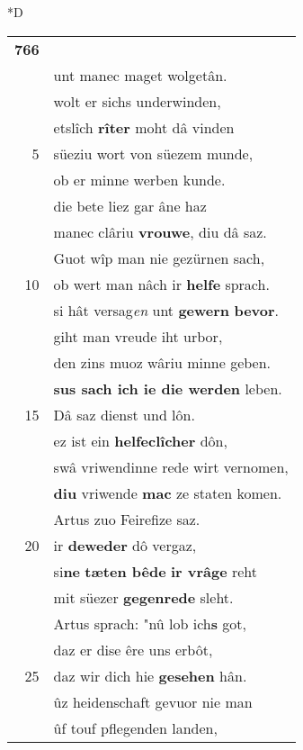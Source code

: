 \documentclass[8pt,a4paper,notitlepage]{article}
\begin{document}
\begin{table}[ht]
\begin{minipage}[t]{0.5\linewidth}
\small
\begin{center}*D
\end{center}
\begin{tabular}{rl}
\textbf{766} & \textit{\begin{large}N\end{large}}ider sâzen wîb und man\\ 
 & unt manec maget wolgetân.\\ 
 & wolt er sichs underwinden,\\ 
 & etslîch \textbf{rîter} moht dâ vinden\\ 
5 & süeziu wort von süezem munde,\\ 
 & ob er minne werben kunde.\\ 
 & die bete liez gar âne haz\\ 
 & manec clâriu \textbf{vrouwe}, diu dâ saz.\\ 
 & Guot wîp man nie gezürnen sach,\\ 
10 & ob wert man nâch ir \textbf{helfe} sprach.\\ 
 & si hât versag\textit{en} unt \textbf{gewern} \textbf{bevor}.\\ 
 & giht man vreude iht urbor,\\ 
 & den zins muoz wâriu minne geben.\\ 
 & \textbf{sus sach ich ie die werden} leben.\\ 
15 & Dâ saz dienst und lôn.\\ 
 & ez ist ein \textbf{helfeclîcher} dôn,\\ 
 & swâ vriwendinne rede wirt vernomen,\\ 
 & \textbf{diu} vriwende \textbf{mac} ze staten komen.\\ 
 & Artus zuo Feirefize saz.\\ 
20 & ir \textbf{deweder} dô vergaz,\\ 
 & si\textbf{ne} \textbf{tæten bêde} \textbf{ir vrâge} reht\\ 
 & mit süezer \textbf{gegenrede} sleht.\\ 
 & Artus sprach: "nû lob ich\textbf{s} got,\\ 
 & daz er dise êre uns erbôt,\\ 
25 & daz wir dich hie \textbf{gesehen} hân.\\ 
 & ûz heidenschaft gevuor nie man\\ 
 & ûf touf pflegenden landen,\\ 

\end{tabular}
\end{minipage}
\end{table}
\end{document}

